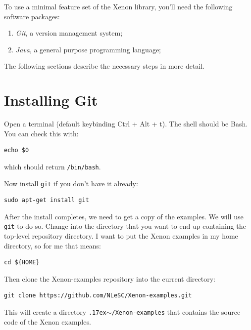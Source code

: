 \documentclass[12pt, a4paper, twoside, openany, titlepage]{book}
\newcommand{\mytilde}{\raise.17ex\hbox{$\scriptstyle\sim$}}
\begin{document}
To use a minimal feature set of the Xenon library, you'll need the following software packages:
\begin{enumerate}
\item{\textit{Git}, a version management system;}
\item{\textit{Java}, a general purpose programming language;}
\end{enumerate}


The following sections describe the necessary steps in more detail.




\section{Installing Git}

Open a terminal (default keybinding Ctrl + Alt + t). The shell should be Bash. You can check this with:
\begin{lstlisting}[style=basic,style=bash]
echo $0
\end{lstlisting} %
which should return \texttt{/bin/bash}.


Now install \texttt{git} if you don't have it already:
\begin{lstlisting}[style=basic,style=bash]
sudo apt-get install git
\end{lstlisting}

After the install completes, we need to get a copy of the examples. We will use \texttt{git} to do so. Change into the directory that you want to end up containing the top-level repository directory. I want to put the Xenon examples in my home directory, so for me that means:
\begin{lstlisting}[style=basic,style=bash]
cd ${HOME}
\end{lstlisting} %

Then clone the Xenon-examples repository into the current directory:
\begin{lstlisting}[style=basic,style=bash]
git clone https://github.com/NLeSC/Xenon-examples.git
\end{lstlisting}
This will create a directory \texttt{\mytilde{}/Xenon-examples} that contains the source code of the Xenon examples.
\end{document}
